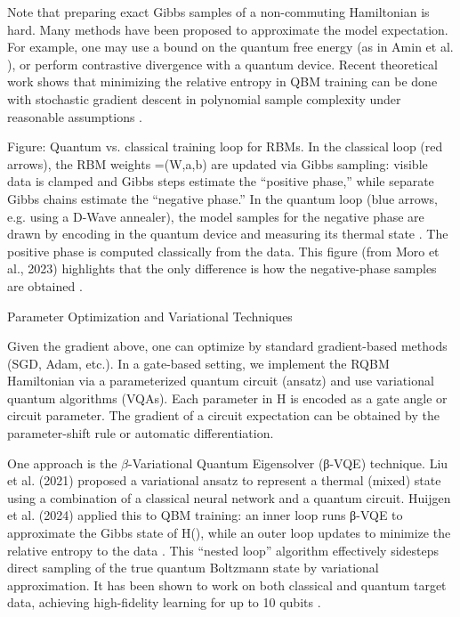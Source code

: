 Note that preparing exact Gibbs samples of a non-commuting Hamiltonian is hard.  Many methods have been proposed to approximate the model expectation.  For example, one may use a bound on the quantum free energy (as in Amin et al. ), or perform contrastive divergence with a quantum device.  Recent theoretical work shows that minimizing the relative entropy in QBM training can be done with stochastic gradient descent in polynomial sample complexity under reasonable assumptions .



Figure: Quantum vs. classical training loop for RBMs.  In the classical loop (red arrows), the RBM weights \Theta=(W,a,b) are updated via Gibbs sampling: visible data is clamped and Gibbs steps estimate the “positive phase,” while separate Gibbs chains estimate the “negative phase.”  In the quantum loop (blue arrows, e.g. using a D-Wave annealer), the model samples for the negative phase are drawn by encoding \Theta in the quantum device and measuring its thermal state .  The positive phase is computed classically from the data.  This figure (from Moro et al., 2023) highlights that the only difference is how the negative-phase samples are obtained .





Parameter Optimization and Variational Techniques





Given the gradient above, one can optimize \theta by standard gradient-based methods (SGD, Adam, etc.).  In a gate-based setting, we implement the RQBM Hamiltonian via a parameterized quantum circuit (ansatz) and use variational quantum algorithms (VQAs).  Each parameter in H is encoded as a gate angle or circuit parameter.  The gradient of a circuit expectation can be obtained by the parameter-shift rule or automatic differentiation.



One approach is the $\beta$-Variational Quantum Eigensolver (β-VQE) technique.  Liu et al. (2021) proposed a variational ansatz to represent a thermal (mixed) state using a combination of a classical neural network and a quantum circuit.  Huijgen et al. (2024) applied this to QBM training: an inner loop runs β-VQE to approximate the Gibbs state of H(\theta), while an outer loop updates \theta to minimize the relative entropy to the data .  This “nested loop” algorithm effectively sidesteps direct sampling of the true quantum Boltzmann state by variational approximation.  It has been shown to work on both classical and quantum target data, achieving high-fidelity learning for up to 10 qubits .



